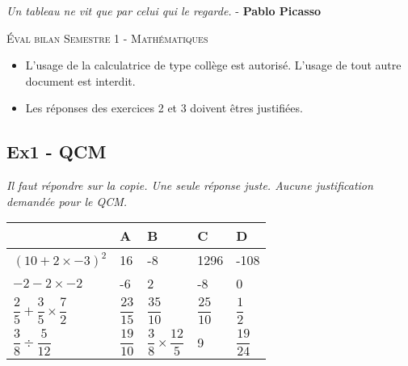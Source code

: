 



\begin{center}
  \textit{Un tableau ne vit que par celui qui le regarde.} - \textbf{Pablo Picasso}
\end{center}

{\Large \textsc{Éval bilan Semestre 1 - Mathématiques}}

\begin{itemize}
    \item L'usage de la calculatrice de type collège est autorisé. L'usage de tout autre document est interdit. 
    \item Les réponses des exercices 2 et 3 doivent êtres justifiées.
  \end{itemize}

\horrule{2px}

\subsection*{Ex1 - QCM}

\textit{Il faut répondre sur la copie. Une seule réponse juste. Aucune justification demandée pour le QCM.}

\begin{center} \renewcommand{\arraystretch}{2.5} \begin{tabular}{|p{3cm}|p{2cm}|p{2cm}|p{2cm}|p{2cm}|}  \hline
      & A & B & C & D \\ \hline
  $(10 + 2 \times -3)^2$  & 16 & -8 & 1296 & -108 \\ \hline
  $-2 -2 \times -2$       & -6 &  2 &   -8 & 0  \\ \hline
  $\dfrac{2}{5} + \dfrac{3}{5} \times \dfrac{7}{2}$ & $\dfrac{23}{15}$ & $\dfrac{35}{10}$ & $\dfrac{25}{10}$ & $\dfrac{1}{2} $ \\ \hline
  $\dfrac{3}{8} \div \dfrac{5}{12}$ & $ \dfrac{19}{10} $ & $ \dfrac{3}{8} \times \dfrac{12}{5} $ & 9 & $ \dfrac{19}{24} $  \\ \hline
\end{tabular} \end{center}

